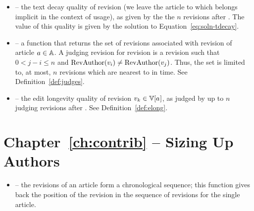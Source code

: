 \begin{itemize}

\item {} -- the text decay quality of revision
     (we leave the article to which  belongs
    implicit in the context of usage), as given by the the $n$ revisions
    after .
    The value of this quality is given by the solution to
    Equation~\ref{eq:soln-tdecay}.

\item {} -- a function that returns the set of
     revisions associated with revision 
    of article $a \in \mathbb{A}$.
    A judging revision for revision  is a revision 
    such that $0 < j - i \le n$ and
    $\mathrm{RevAuthor}(v_{i}) \not= \mathrm{RevAuthor}(v_{j})$.
    Thus, the set is limited to, at most, $n$ revisions which are nearest
    to  in time.  See Definition~\ref{def:judges}.

\item {} -- the edit longevity quality of
    revision $\version{k} \in \versions{\article{}}$, as judged by up to
    $n$ judging revisions after .
    See Definition~\ref{def:elong}.

\end{itemize}

\section{Chapter~\ref{ch:contrib} -- Sizing Up Authors}

\begin{itemize}

\item {} -- the revisions of an article form a
    chronological sequence; this function gives back the position
    of the revision in the sequence of revisions for the single article.

\end{itemize}

\renewcommand{\labelitemi}{$\bullet$}



